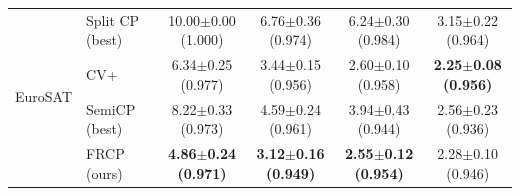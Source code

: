 \begin{table}[t]
\begin{tabular}{llcccc}
\midrule
\multirow{4}{*}{EuroSAT} & Split CP (best) & 10.00$\pm$0.00 {\scriptsize(1.000)} & 6.76$\pm$0.36 {\scriptsize(0.974)} & 6.24$\pm$0.30 {\scriptsize(0.984)} & 3.15$\pm$0.22 {\scriptsize(0.964)}\\
 & CV+ & 6.34$\pm$0.25 {\scriptsize(0.977)} & 3.44$\pm$0.15 {\scriptsize(0.956)} & 2.60$\pm$0.10 {\scriptsize(0.958)} & \textbf{2.25$\pm$0.08 {\scriptsize(0.956)}}\\
 & SemiCP (best) & 8.22$\pm$0.33 {\scriptsize(0.973)} & 4.59$\pm$0.24 {\scriptsize(0.961)} & 3.94$\pm$0.43 {\scriptsize(0.944)} & 2.56$\pm$0.23 {\scriptsize(0.936)}\\
 & FRCP (ours) & \textbf{4.86$\pm$0.24 {\scriptsize(0.971)}} & \textbf{3.12$\pm$0.16 {\scriptsize(0.949)}} & \textbf{2.55$\pm$0.12 {\scriptsize(0.954)}} & 2.28$\pm$0.10 {\scriptsize(0.946)}\\
\bottomrule
\end{tabular}
\end{table}
